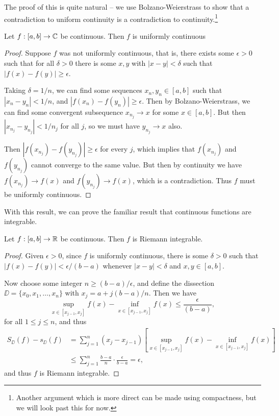 \documentclass[a4paper]{scrartcl}
\begin{document}
The proof of this is quite natural -- we use Bolzano-Weierstrass to show that a contradiction to uniform continuity is a contradiction to continuity.\footnote{Another argument which is more direct can be made using compactness, but we will look past this for now.}

\begin{theorem}
    Let $f: [a, b] \rightarrow \mathbb{C}$ be continuous. Then $f$ is uniformly continuous
\end{theorem}
\begin{proof}
	Suppose $f$ was not uniformly continuous, that is, there exists some $\epsilon > 0$ such that for all $\delta > 0$ there is some $x, y$ with $|x - y| < \delta$ such that $|f(x) - f(y)| \geq \epsilon$.

	Taking $\delta = 1/n$, we can find some sequences $x_n, y_n \in [a, b]$ such that $|x_n - y_n| < 1/n$, and $|f(x_n) - f(y_n)| \geq \epsilon$. Then by Bolzano-Weierstrass, we can find some convergent subsequence $x_{n_j} \rightarrow x$ for some $x \in [a, b]$. But then $|x_{n_j} - y_{n_j}| < 1/n_j$ for all $j$, so we must have $y_{n_j} \rightarrow x$ also.

	Then $|f(x_{n_j}) - f(y_{n_j})| \geq \epsilon$ for every $j$, which implies that $f(x_{n_j})$ and $f(y_{n_j})$ cannot converge to the same value. But then by continuity we have $f(x_{n_j}) \rightarrow f(x)$ and $f(y_{n_j}) \rightarrow f(x)$, which is a contradiction. Thus $f$ must be uniformly continuous.
\end{proof}

With this result, we can prove the familiar result that continuous functions are integrable.

\begin{theorem}
	Let $f:[a, b] \rightarrow \mathbb{R}$ be continuous. Then $f$ is Riemann integrable.
\end{theorem}
\begin{proof}
	Given $\epsilon > 0$, since $f$ is uniformly continuous, there is some $\delta > 0$ such that $|f(x) - f(y)| < \epsilon/(b - a)$ whenever $|x - y| < \delta$ and $x, y \in [a, b]$.

	Now choose some integer $n \geq (b - a)/\epsilon$, and define the dissection $\DD = \{x_0, x_1, \dots, x_n\}$ with $x_j = a + j(b - a)/n$. Then we have
	$$
	\sup_{x \in [x_{j - 1}, x_j]} f(x) - \inf_{x \in [x_{j - 1}, x_j]} f(x) \leq \frac{\epsilon}{(b - a)},
	$$
	for all $1 \leq j \leq n$, and thus 
	\begin{align*}
		S_\DD(f) - s_\DD(f) &= \sum_{j = 1}^n (x_j - x_{j - 1})\left[\sup_{x \in [x_{j - 1}, x_j]} f(x) - \inf_{x \in [x_{j - 1}, x_j]} f(x)\right] \\
		&\leq \sum_{j = 1}^n \frac{b - a}{n} \cdot \frac{\epsilon}{b - a} = \epsilon,
	\end{align*}
	and thus $f$ is Riemann integrable.
\end{proof}
\end{document}
